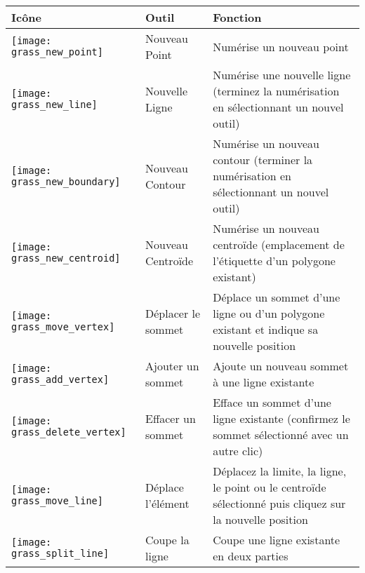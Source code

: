 {{\begin{table}[p]
\begin{tabular}{|m{1cm}|m{4cm}|m{8.5cm}|}
\hline \textbf{Icône} & \textbf{Outil} & \textbf{Fonction} \\
\hline \texttt{[image: grass\_new\_point]} & Nouveau Point & Numérise un nouveau point \\
\hline \texttt{[image: grass\_new\_line]} & Nouvelle Ligne & Numérise une nouvelle ligne (terminez la numérisation en sélectionnant un nouvel outil) \\
\hline \texttt{[image: grass\_new\_boundary]} & Nouveau Contour & Numérise un nouveau contour (terminer la numérisation en sélectionnant un nouvel outil)\\
\hline \texttt{[image: grass\_new\_centroid]} & Nouveau Centroïde & Numérise un nouveau centroïde (emplacement de l'étiquette d'un polygone existant)\\
\hline \texttt{[image: grass\_move\_vertex]} & Déplacer le sommet & Déplace un sommet d'une ligne ou d'un polygone existant et indique sa nouvelle position\\
\hline \texttt{[image: grass\_add\_vertex]} & Ajouter un sommet & Ajoute un nouveau sommet à une ligne existante\\
\hline \texttt{[image: grass\_delete\_vertex]} & Effacer un sommet & Efface un sommet d'une ligne existante (confirmez le sommet sélectionné avec un autre clic)\\
\hline \texttt{[image: grass\_move\_line]} & Déplace l'élément & Déplacez la limite, la ligne, le point ou le centroïde sélectionné puis cliquez sur la nouvelle position\\
\hline \texttt{[image: grass\_split\_line]} & Coupe la ligne & Coupe une ligne existante en deux parties\\

\end{tabular}
\end{table}}}
